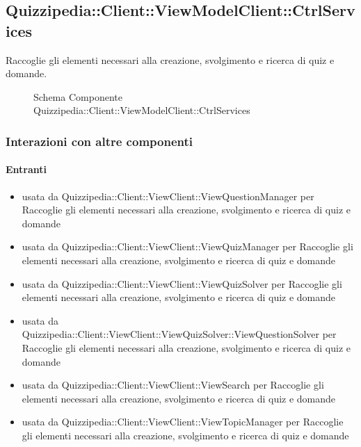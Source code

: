 \subsection{Quizzipedia::Client::ViewModelClient::CtrlServices}
Raccoglie gli elementi necessari alla creazione, svolgimento e ricerca di quiz e domande.
\begin{figure}[H]
\centering
\noindent{}
\caption[Schema Componente Quizzipedia::Client::ViewModelClient::CtrlServices]{Schema Componente Quizzipedia::Client::ViewModelClient::CtrlServices}
\end{figure}
\subsubsection{Interazioni con altre componenti}
\paragraph{Entranti}
\begin{itemize}
\item usata da Quizzipedia::Client::ViewClient::ViewQuestionManager per Raccoglie gli elementi necessari alla creazione, svolgimento e ricerca di quiz e domande
\item usata da Quizzipedia::Client::ViewClient::ViewQuizManager per Raccoglie gli elementi necessari alla creazione, svolgimento e ricerca di quiz e domande
\item usata da Quizzipedia::Client::ViewClient::ViewQuizSolver per Raccoglie gli elementi necessari alla creazione, svolgimento e ricerca di quiz e domande
\item usata da Quizzipedia::Client::ViewClient::ViewQuizSolver::ViewQuestionSolver per Raccoglie gli elementi necessari alla creazione, svolgimento e ricerca di quiz e domande
\item usata da Quizzipedia::Client::ViewClient::ViewSearch per Raccoglie gli elementi necessari alla creazione, svolgimento e ricerca di quiz e domande
\item usata da Quizzipedia::Client::ViewClient::ViewTopicManager per Raccoglie gli elementi necessari alla creazione, svolgimento e ricerca di quiz e domande
\end{itemize}
